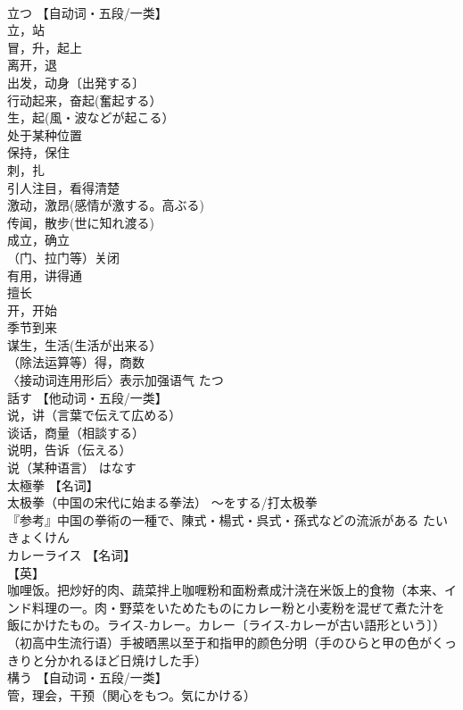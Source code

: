 \documentclass[8pt]{extreport}
\begin{document}
\begin{CJK}{UTF8}{min}
\\	立つ	【自动词・五段/一类】 
\\	立，站 
\\	冒，升，起上 
\\	离开，退 
\\	出发，动身〔出発する〕 
\\	行动起来，奋起(奮起する） 
\\	生，起(風・波などが起こる） 
\\	处于某种位置 
\\	保持，保住 
\\	刺，扎 
\\	引人注目，看得清楚 
\\	激动，激昂(感情が激する。高ぶる) 
\\	传闻，散步(世に知れ渡る) 
\\	成立，确立 
\\	（门、拉门等）关闭 
\\	有用，讲得通 
\\	擅长 
\\	开，开始 
\\	季节到来 
\\	谋生，生活(生活が出来る） 
\\	（除法运算等）得，商数 
\\	〈接动词连用形后〉表示加强语气	たつ	
\\	話す	【他动词・五段/一类】 
\\	说，讲（言葉で伝えて広める） 
\\	谈话，商量（相談する） 
\\	说明，告诉（伝える） 
\\	说（某种语言）	はなす	
\\	太極拳	【名词】 
\\	太极拳（中国の宋代に始まる拳法） 〜をする/打太极拳 
\\	『参考』中国の拳術の一種で、陳式・楊式・呉式・孫式などの流派がある	たいきょくけん	
\\	カレーライス	【名词】 
\\	【英】
\\	咖哩饭。把炒好的肉、蔬菜拌上咖喱粉和面粉煮成汁浇在米饭上的食物（本来、インド料理の一。肉・野菜をいためたものにカレー粉と小麦粉を混ぜて煮た汁を飯にかけたもの。ライス-カレー。カレー〔ライス-カレーが古い語形という〕） 
\\	（初高中生流行语）手被晒黑以至于和指甲的颜色分明（手のひらと甲の色がくっきりと分かれるほど日焼けした手）		
\\	構う	【自动词・五段/一类】 
\\	管，理会，干预（関心をもつ。気にかける） 

\end{CJK}
\end{document}
